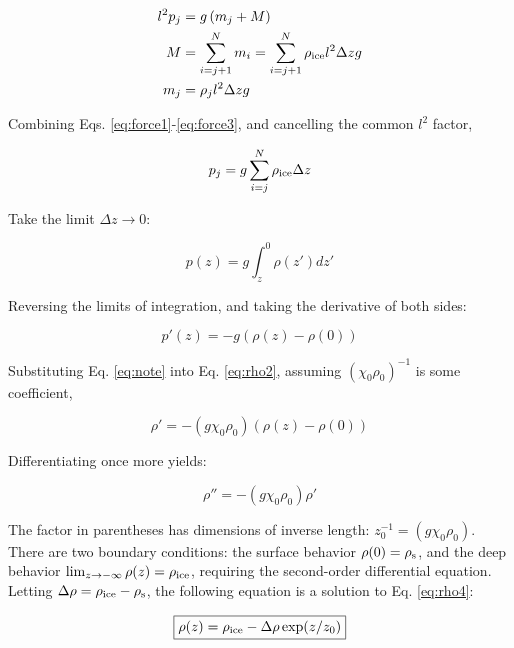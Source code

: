 \documentclass[12pt]{article}
\begin{document}
\begin{align}
l^2 p_{j} &= g\left(m_{j} + M\right) \label{eq:force1} \\
M &= \sum_{i = j+1}^{N} m_{i} = \sum_{i = j+1}^{N} \rho_{\rm ice} l^2 \Delta z g \label{eq:force2} \\
m_{j} &= \rho_{j} l^2 \Delta z g \label{eq:force3}
\end{align}

Combining Eqs. \ref{eq:force1}-\ref{eq:force3}, and cancelling the common $l^2$ factor,

\begin{equation}
p_{j} = g \sum_{i = j}^{N} \rho_{\rm ice} \Delta z
\end{equation}

Take the limit $\Delta z \to 0$:

\begin{equation}
p(z) = g \int_{z}^{0} \rho(z') dz'
\label{eq:rho1}
\end{equation}

Reversing the limits of integration, and taking the derivative of both sides:

\begin{equation}
p'(z) = -g(\rho(z) - \rho(0))
\label{eq:rho2}
\end{equation}

Substituting Eq. \ref{eq:note} into Eq. \ref{eq:rho2}, assuming $(\chi_0\rho_0)^{-1}$ is some coefficient,

\begin{equation}
\rho' = -\left(g \chi_0 \rho_0\right)(\rho(z)-\rho(0))
\label{eq:rho3}
\end{equation}

Differentiating once more yields:

\begin{equation}
\rho'' = -\left(g \chi_0 \rho_{0}\right) \rho'
\label{eq:rho4}
\end{equation}

The factor in parentheses has dimensions of inverse length: $z_0^{-1} = \left(g \chi_0 \rho_{0}\right)$.  There are two boundary conditions: the surface behavior $\rho(0) = \rho_{\rm s}$, and the deep behavior $\lim_{z\to-\infty} \rho(z) = \rho_{\rm ice}$, requiring the second-order differential equation.  Letting $\Delta\rho = \rho_{\rm ice} - \rho_{\rm s}$, the following equation is a solution to Eq. \ref{eq:rho4}:

\begin{equation}
\boxed{\rho(z) = \rho_{\rm ice} - \Delta \rho \exp(z/z_0)}
\label{eq:rho5}
\end{equation}
\end{document}
